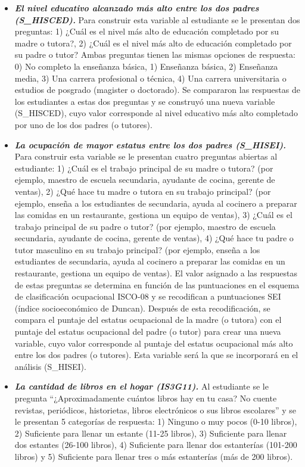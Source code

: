 \documentclass[12pt,twoside]{templates/facsothesis}
\begin{document}
\begin{itemize}
\item
  \textbf{\emph{El nivel educativo alcanzado más alto entre los dos padres (S\_HISCED).}} Para construir esta variable al estudiante se le presentan dos preguntas: 1) ¿Cuál es el nivel más alto de educación completado por su madre o tutora?, 2) ¿Cuál es el nivel más alto de educación completado por su padre o tutor? Ambas preguntas tienen las mismas opciones de respuesta: 0) No completo la enseñanza básica, 1) Enseñanza básica, 2) Enseñanza media, 3) Una carrera profesional o técnica, 4) Una carrera universitaria o estudios de posgrado (magister o doctorado). Se compararon las respuestas de los estudiantes a estas dos preguntas y se construyó una nueva variable (S\_HISCED), cuyo valor corresponde al nivel educativo más alto completado por uno de los dos padres (o tutores).
\item
  \textbf{\emph{La ocupación de mayor estatus entre los dos padres (S\_HISEI).}} Para construir esta variable se le presentan cuatro preguntas abiertas al estudiante: 1) ¿Cuál es el trabajo principal de su madre o tutora? (por ejemplo, maestro de escuela secundaria, ayudante de cocina, gerente de ventas), 2) ¿Qué hace tu madre o tutora en su trabajo principal? (por ejemplo, enseña a los estudiantes de secundaria, ayuda al cocinero a preparar las comidas en un restaurante, gestiona un equipo de ventas), 3) ¿Cuál es el trabajo principal de su padre o tutor? (por ejemplo, maestro de escuela secundaria, ayudante de cocina, gerente de ventas), 4) ¿Qué hace tu padre o tutor masculino en su trabajo principal? (por ejemplo, enseña a los estudiantes de secundaria, ayuda al cocinero a preparar las comidas en un restaurante, gestiona un equipo de ventas). El valor asignado a las respuestas de estas preguntas se determina en función de las puntuaciones en el esquema de clasificación ocupacional ISCO-08 y se recodifican a puntuaciones SEI (índice socioeconómico de Duncan). Después de esta recodificación, se compara el puntaje del estatus ocupacional de la madre (o tutora) con el puntaje del estatus ocupacional del padre (o tutor) para crear una nueva variable, cuyo valor corresponde al puntaje del estatus ocupacional más alto entre los dos padres (o tutores). Esta variable será la que se incorporará en el análisis (S\_HISEI).
\item
  \textbf{\emph{La cantidad de libros en el hogar (IS3G11).}} Al estudiante se le pregunta ``¿Aproximadamente cuántos libros hay en tu casa? No cuente revistas, periódicos, historietas, libros electrónicos o sus libros escolares'' y se le presentan 5 categorías de respuesta: 1) Ninguno o muy pocos (0-10 libros), 2) Suficiente para llenar un estante (11-25 libros), 3) Suficiente para llenar dos estantes (26-100 libros), 4) Suficiente para llenar dos estanterías (101-200 libros) y 5) Suficiente para llenar tres o más estanterías (más de 200 libros).
\end{itemize}
\end{document}
